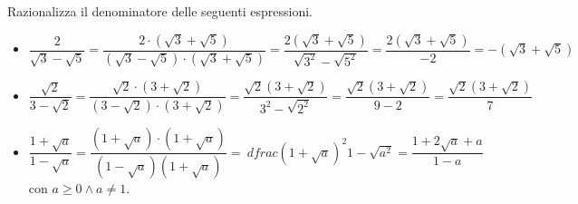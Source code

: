 \begin{exrig}
 \begin{esempio}
Razionalizza il denominatore delle seguenti espressioni.
\begin{itemize}
 \item $\dfrac 2{\sqrt 3-\sqrt 5}=
 \dfrac{2\cdot (\sqrt 3+\sqrt 5)}{(\sqrt 3-\sqrt 5)\cdot (\sqrt 3+\sqrt 5)}=
 \dfrac{2(\sqrt 3+\sqrt 5)}{\sqrt{3^2}-\sqrt{5^2}}=
 \dfrac{2(\sqrt 3+\sqrt 5)}{-2}=-(\sqrt 3+\sqrt 5)$
 \item $\dfrac{\sqrt 2}{3-\sqrt 2}=
 \dfrac{\sqrt 2\cdot (3+\sqrt 2)}{(3-\sqrt 2)\cdot (3+\sqrt 2)}=
 \dfrac{\sqrt 2(3+\sqrt 2)}{3^2-\sqrt{2^2}}=\dfrac{\sqrt 2(3+\sqrt 2)}{9-2}=
 \dfrac{\sqrt 2(3+\sqrt 2)} 7$
 \item $\dfrac{1+\sqrt a}{1-\sqrt a}=
 \dfrac{(1+\sqrt a)\cdot (1+\sqrt a)}{(1-\sqrt a)(1+\sqrt a)}=\
 dfrac{(1+\sqrt a)^2}{1-\sqrt{a^2}}=\dfrac{1+2\sqrt a+a}{1-a}$ 
 con $a\ge 0\wedge a\neq 1$.
\end{itemize}
 \end{esempio}
\end{exrig}

